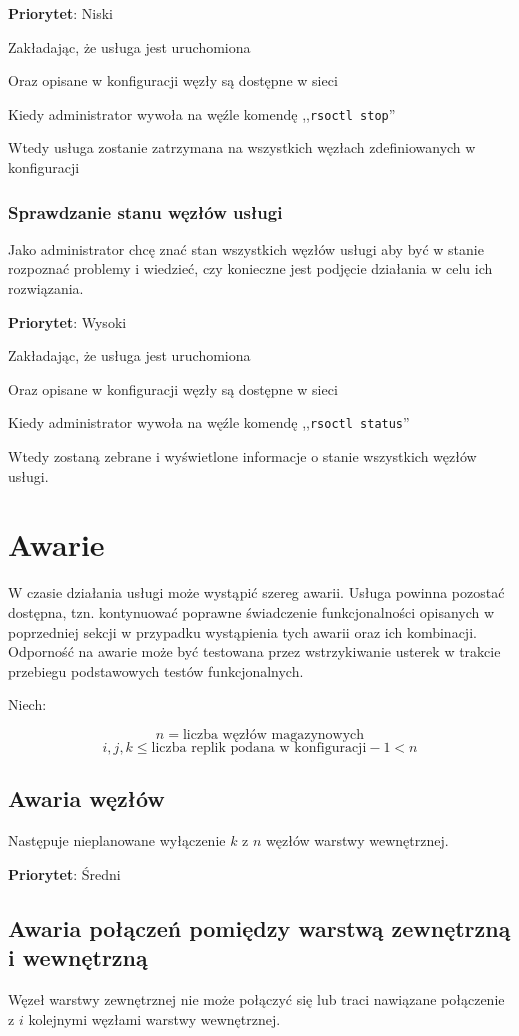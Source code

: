 \documentclass[a4paper,11pt]{article}
\begin{document}
\textbf{Priorytet}: Niski

Zakładając, że usługa jest uruchomiona

Oraz opisane w konfiguracji węzły są dostępne w sieci

Kiedy administrator wywoła na węźle komendę ,,\texttt{rsoctl stop}''

Wtedy usługa zostanie zatrzymana na wszystkich węzłach zdefiniowanych w konfiguracji

\subsubsection{Sprawdzanie stanu węzłów usługi}
Jako administrator chcę znać stan wszystkich węzłów usługi aby być w
stanie rozpoznać problemy i wiedzieć, czy konieczne jest podjęcie
działania w celu ich rozwiązania.

\textbf{Priorytet}: Wysoki

Zakładając, że usługa jest uruchomiona

Oraz opisane w konfiguracji węzły są dostępne w sieci

Kiedy administrator wywoła na węźle komendę ,,\texttt{rsoctl status}''

Wtedy zostaną zebrane i wyświetlone informacje o stanie wszystkich
węzłów usługi.

\section{Awarie}
W czasie działania usługi może wystąpić szereg awarii. Usługa powinna
pozostać dostępna, tzn. kontynuować poprawne świadczenie funkcjonalności
opisanych w poprzedniej sekcji w przypadku wystąpienia tych awarii oraz
ich kombinacji. Odporność na awarie może być testowana przez
wstrzykiwanie usterek w trakcie przebiegu podstawowych testów
funkcjonalnych.

Niech:

\[ n = \mbox{liczba węzłów magazynowych} \]
\[ i, j, k \leq \mbox{liczba replik podana w konfiguracji} - 1 < n \]

\subsection{Awaria węzłów}
Następuje nieplanowane wyłączenie $k$ z $n$ węzłów warstwy wewnętrznej.

\textbf{Priorytet}: Średni

\subsection{Awaria połączeń pomiędzy warstwą zewnętrzną i wewnętrzną}
Węzeł warstwy zewnętrznej nie może połączyć się lub traci nawiązane
połączenie z $i$ kolejnymi węzłami warstwy wewnętrznej.
\end{document}
